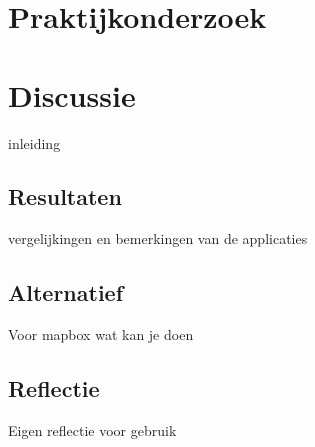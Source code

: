 \section{Praktijkonderzoek}
\label{sec:praktijkonderzoek}



\section{Discussie}
\label{sec:discussie}

inleiding

\subsection{Resultaten}
\label{sec:resultaten}

vergelijkingen en bemerkingen van de applicaties

\subsection{Alternatief}
\label{sec:alternatief}

Voor mapbox wat kan je doen

\subsection{Reflectie}
\label{sec:reflectie}

Eigen reflectie voor gebruik